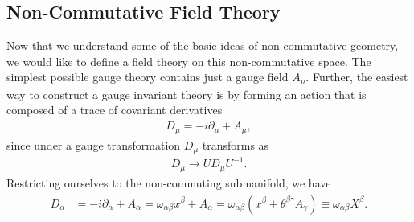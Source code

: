     \subsection{Non-Commutative Field Theory}

    Now that we understand some of the basic ideas of non-commutative geometry, we would like to define a field theory on this non-commutative space. The simplest possible gauge theory contains just a gauge field $A_{\mu}$. Further, the easiest way to construct a gauge invariant theory is by forming an action that is composed of a trace of covariant derivatives 
    \begin{align}
        D_{\mu} = -i \partial_{\mu} + A_{\mu},
    \end{align}
    since under a gauge transformation $D_{\mu}$ transforms as
    \begin{align}
        D_{\mu} \rightarrow U D_{\mu} U^{-1}.
    \end{align}
    Restricting ourselves to the non-commuting submanifold, we have
    \begin{align}
        D_{\alpha} &= -i \partial_{\alpha} + A_{\alpha} = \omega_{\alpha \beta}x^{\beta}+ A_{\alpha} = \omega_{\alpha \beta} \left( x^{\beta}+ \theta^{\beta \gamma} A_{\gamma} \right) \equiv \omega_{\alpha \beta} X^{\beta}.
    \end{align}
    

